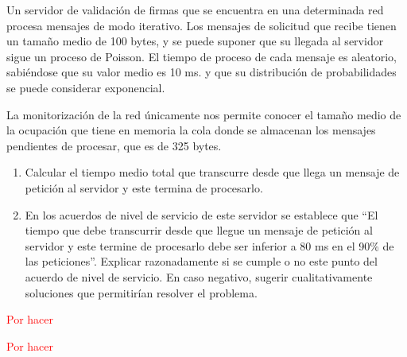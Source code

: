 \begin{problem}[19]
Un servidor de validación de firmas que se encuentra en una determinada red procesa mensajes de modo iterativo. Los mensajes de solicitud que recibe tienen un tamaño medio de 100 bytes, y se puede suponer que su llegada al servidor sigue un proceso de Poisson. El tiempo de proceso de cada mensaje es aleatorio, sabiéndose que su valor medio es 10 ms. y que su distribución de probabilidades se puede considerar exponencial.

La monitorización de la red únicamente nos permite conocer el tamaño medio de la ocupación que tiene en memoria la cola donde se almacenan los mensajes pendientes de procesar, que es de 325 bytes.
\begin{enumerate}
\item Calcular el tiempo medio total que transcurre desde que llega un mensaje de petición al servidor y este termina de procesarlo.
\item En los acuerdos de nivel de servicio de este servidor se establece que ``El tiempo que debe transcurrir desde que llegue un mensaje de petición al servidor y este termine de procesarlo debe ser inferior a 80 ms en el 90\% de las peticiones''. Explicar razonadamente si se cumple o no este punto del acuerdo de nivel de servicio. En caso negativo, sugerir cualitativamente soluciones que permitirían resolver el problema.
\end{enumerate}

\solution

\textcolor{red}{Por hacer}

\end{problem}

\begin{problem}[20]\label{tema2:prob20}

\solution

\textcolor{red}{Por hacer}

\end{problem}


